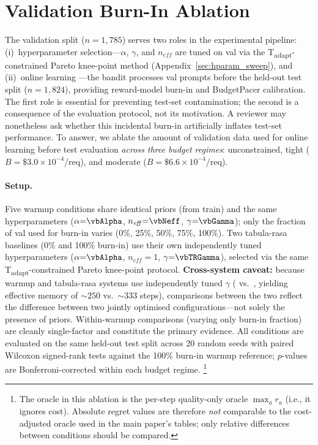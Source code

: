 
\section{Validation Burn-In Ablation}
\label{appendix:val_burnin_ablation}

The validation split ($n{=}1{,}785$) serves two roles in the
experimental pipeline: (i)~hyperparameter selection---$\alpha$,
$\gamma$, and $n_\mathit{eff}$ are tuned on val via the
T\textsubscript{adapt}-constrained Pareto knee-point method
(Appendix~\ref{sec:hparam_sweep}), and (ii)~online learning
---the bandit processes val prompts before the held-out test split
($n{=}1{,}824$), providing reward-model burn-in and BudgetPacer
calibration.  The first role is essential for preventing test-set
contamination; the second is a consequence of the evaluation protocol,
not its motivation.  A reviewer may nonetheless ask whether this
incidental burn-in artificially inflates test-set performance.
To answer, we ablate the amount of validation data used for online
learning before test evaluation \emph{across three budget regimes}:
unconstrained, tight ($B{=}\$3.0{\times}10^{-4}$/req), and moderate
($B{=}\$6.6{\times}10^{-4}$/req).

\paragraph{Setup.}
Five warmup conditions share identical priors (from train) and the
same hyperparameters ($\alpha{=}\vbAlpha$, $n_\mathit{eff}{=}\vbNeff$,
$\gamma{=}\vbGamma$); only the fraction of val used for burn-in varies
(0\%, 25\%, 50\%, 75\%, 100\%).  Two tabula-rasa baselines (0\% and
100\% burn-in) use their own independently tuned hyperparameters
($\alpha{=}\vbAlpha$, $n_\mathit{eff}{=}1$, $\gamma{=}\vbTRGamma$), selected
via the same T\textsubscript{adapt}-constrained Pareto knee-point
protocol.
\textbf{Cross-system caveat:} because warmup and tabula-rasa systems
use independently tuned $\gamma$ (\vbGamma{} vs.\ \vbTRGamma, yielding effective
memory of ${\sim}250$ vs.\ ${\sim}333$ steps), comparisons between
the two reflect the difference between two jointly optimised
configurations---not solely the presence of priors.
Within-warmup comparisons (varying only burn-in fraction) are cleanly
single-factor and constitute the primary evidence.
All conditions are evaluated on the same held-out test
split across 20 random seeds with paired Wilcoxon signed-rank tests
against the 100\% burn-in warmup reference; $p$-values are
Bonferroni-corrected within each budget regime.%
\footnote{The oracle in this ablation is the per-step quality-only
oracle $\max_a r_a$ (i.e., it ignores cost).  Absolute regret values
are therefore \emph{not} comparable to the cost-adjusted oracle used in
the main paper's tables; only relative differences between conditions
should be compared.}

